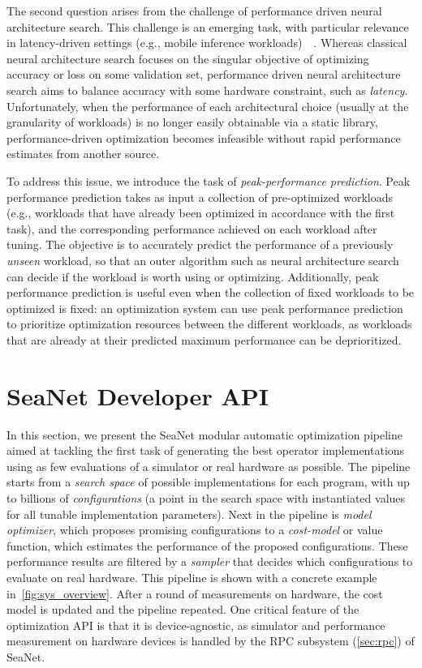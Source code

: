 The second question arises from the challenge of performance driven neural architecture search.
This challenge is an emerging task, with particular relevance in latency-driven settings (e.g., mobile inference workloads)~\cite{tan2019mnasnet}~\cite{2018arXiv181200332C}.
Whereas classical neural architecture search focuses on the singular objective of optimizing accuracy or loss on some validation set, performance driven neural architecture search aims to balance accuracy with some hardware constraint, such as \emph{latency}.
Unfortunately, when the performance of each architectural choice (usually at the granularity of workloads) is no longer easily obtainable via a static library, performance-driven optimization becomes infeasible without rapid performance estimates from another source.

To address this issue, we introduce the task of \emph{peak-performance prediction}.
Peak performance prediction takes as input a collection of pre-optimized workloads (e.g., workloads that have already been optimized in accordance with the first task), and the corresponding performance achieved on each workload after tuning.
The objective is to accurately predict the performance of a previously \emph{unseen} workload, so that an outer algorithm such as neural architecture search can decide if the workload is worth using or optimizing.
Additionally, peak performance prediction is useful even when the collection of fixed workloads to be optimized is fixed: an optimization system can use peak performance prediction to prioritize optimization resources between the different workloads, as workloads that are already at their predicted maximum performance can be deprioritized.

\section{SeaNet Developer API}
In this section, we present the SeaNet modular automatic optimization pipeline aimed at tackling the first task of generating the best operator implementations using as few evaluations of a simulator or real hardware as possible.
The pipeline starts from a \emph{search space} of possible implementations for each program, with up to billions of \emph{configurations} (a point in the search space with instantiated values for all tunable implementation parameters).
Next in the pipeline is \emph{model optimizer}, which proposes promising configurations to a \emph{cost-model} or value function, which estimates the performance of the proposed configurations.
These performance results are filtered by a \emph{sampler} that  decides which configurations to evaluate on real hardware. This pipeline is shown with a concrete example in~\autoref{fig:sys_overview}.
After a round of measurements on hardware, the cost model is updated and the pipeline repeated.
One critical feature of the optimization API is that it is device-agnostic, as simulator and performance measurement on hardware devices is handled by the RPC subsystem (\autoref{sec:rpc}) of SeaNet.


